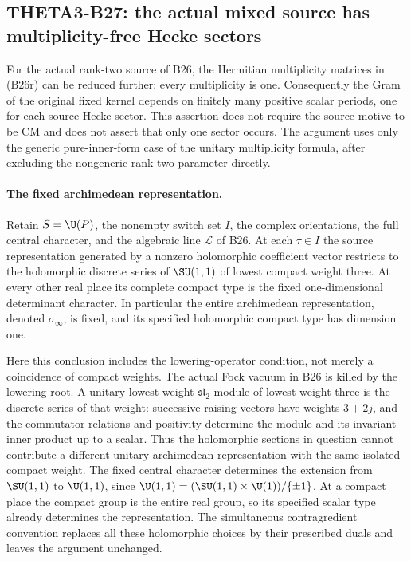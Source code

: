 \subsection{THETA3-B27: the actual mixed source has multiplicity-free Hecke sectors}\label{B27}

For the actual rank-two source of B26, the Hermitian multiplicity
matrices in (B26r) can be reduced further: every multiplicity is one.
Consequently the Gram of the original fixed kernel depends on finitely
many positive scalar periods, one for each source Hecke sector.
This assertion does not require the source motive to be CM and does
not assert that only one sector occurs.  The argument uses only the
generic pure-inner-form case of the unitary multiplicity formula,
after excluding the nongeneric rank-two parameter directly.

\paragraph{The fixed archimedean representation.}
Retain $S=\U(P)$, the nonempty switch set $I$, the complex orientations,
the full central character, and the algebraic line $\mathscr L$ of B26.
At each $\tau\in I$ the source representation generated by a nonzero
holomorphic coefficient vector restricts to the holomorphic
discrete series of $\SU(1,1)$ of lowest compact weight three.
At every other real place its complete compact type is the fixed
one-dimensional determinant character.  In particular the entire
archimedean representation, denoted $\sigma_\infty$, is fixed, and
its specified holomorphic compact type has dimension one.

Here this conclusion includes the lowering-operator condition,
not merely a coincidence of compact weights.  The actual Fock
vacuum in B26 is killed by the lowering root.  A unitary
lowest-weight $\mathfrak{sl}_2$ module of lowest weight three is the
discrete series of that weight: successive raising vectors have
weights $3+2j$, and the commutator relations and positivity determine
the module and its invariant inner product up to a scalar.  Thus
the holomorphic sections in question cannot contribute a different
unitary archimedean representation with the same isolated compact
weight.  The fixed central character determines the extension
from $\SU(1,1)$ to $\U(1,1)$, since
$\U(1,1)=(\SU(1,1)\times\U(1))/\{\pm1\}$.
At a compact place the compact group is the entire real group,
so its specified scalar type already determines the representation.
The simultaneous contragredient convention replaces all these
holomorphic choices by their prescribed duals and leaves the
argument unchanged.


